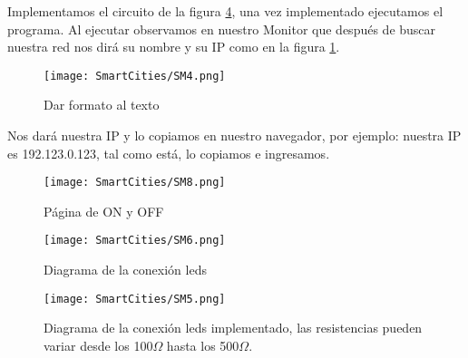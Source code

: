 \documentclass[
	12pt, %
	fleqn, %
	a4paper, %
	oneside, %
]{LegrandOrangeBook}
\begin{document}
Implementamos el circuito de la figura \ref{fig:espleds2}, una vez implementado ejecutamos el programa.
Al ejecutar observamos en nuestro Monitor que después de buscar nuestra red nos dirá su nombre y su IP como en la figura \ref{fig:wifi+ip}.
\begin{figure}[h]
\centering\texttt{[image: SmartCities/SM4.png]}
\caption{Dar formato al texto}
\label{fig:wifi+ip}
\end{figure}
Nos dará nuestra IP y lo copiamos en nuestro navegador, por ejemplo: nuestra IP es 192.123.0.123, tal como está, lo copiamos e ingresamos.
\begin{figure}[h]
\centering
\texttt{[image: SmartCities/SM8.png]}
\caption{Página de ON y OFF}
\label{fig:paginaonoff}
\end{figure}
\begin{figure}[H]
\centering
\texttt{[image: SmartCities/SM6.png]}
\caption{Diagrama de la conexión leds}
\label{espleds1}
\end{figure}
\begin{figure}[H]
\centering
\texttt{[image: SmartCities/SM5.png]}
\caption{Diagrama de la conexión leds implementado, las resistencias pueden variar desde los 100$\Omega$ hasta los 500$\Omega$.}
\label{fig:espleds2}
\end{figure}
\newpage
\end{document}
